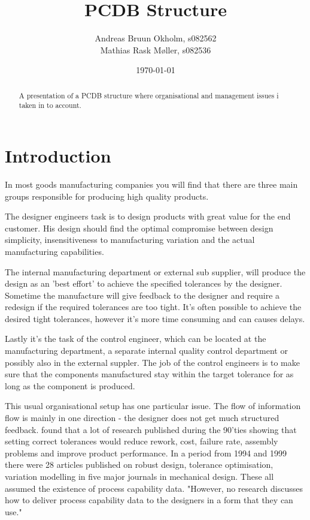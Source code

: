\documentclass[aip,amsmath,reprint, author-year]{revtex4-1}
\begin{document}
\begin{abstract}
A presentation of a PCDB structure where organisational and management issues i taken in to account.
\end{abstract}

\title{PCDB Structure}
\author{Andreas Bruun Okholm, s082562\\
Mathias Rask Møller, s082536 }  
 
\date{\today}
\maketitle


\section{Introduction}
In most goods manufacturing companies you will find that there are three main groups responsible for producing high quality products.

The designer engineers task is to design products with great value for the end customer. 
His design should find the optimal compromise between design simplicity, insensitiveness to manufacturing variation and the actual manufacturing capabilities. 

The internal manufacturing department or external sub supplier, will produce the design as an 'best effort' to achieve the specified tolerances by the designer. Sometime the manufacture will give feedback to the designer and require a redesign if the required tolerances are too tight. It's often possible to achieve the desired tight tolerances, however it's more time consuming and can causes delays.

Lastly it's the task of the control engineer, which can be located at the manufacturing department, a separate internal quality control department or possibly also in the external suppler. 
The job of the control engineers is to make sure that the components manufactured stay within the target tolerance for as long as the component is produced.

This usual organisational setup has one particular issue. 
The flow of information flow is mainly in one direction - the designer does not get much structured feedback. \citet{tata1999process} found that a lot of research published during the 90'ties showing that setting correct tolerances would reduce rework, cost, failure rate, assembly problems and improve product performance. 
In a period from 1994 and 1999 there were 28 articles published on robust design, tolerance optimisation, variation modelling in five major journals in mechanical design. 
These all assumed the existence of process capability data. 
"However, no research discusses how to deliver process capability data to the designers in a form that they can use." \cite{tata1999process}
\end{document}
